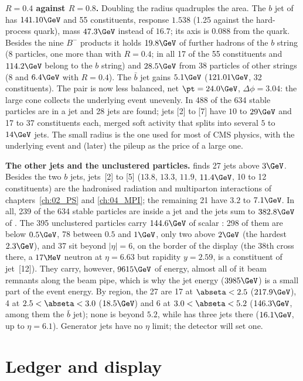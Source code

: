 \textbf{$R=0.4$ against $R=0.8$.} Doubling the radius quadruples the area. The $b$ jet of 
has $141.10\GeV$ and 55 constituents, response $1.538$ (1.25 against the hard-process quark), mass
$47.3\GeV$ instead of $16.7$; its axis is $0.088$ from the quark. Besides the nine $B^-$ products it holds
$19.8\GeV$ of further hadrons of the $b$ string (8 particles, one more than with $R=0.4$; in all 17 of the 55
constituents and $114.2\GeV$ belong to the $b$ string) and $28.5\GeV$ from 38 particles of other strings
(8 and $6.4\GeV$ with $R=0.4$). The $\bar b$ jet gains $5.1\GeV$ ($121.01\GeV$,
32 constituents). The pair is now less balanced, net $\pt=24.0\GeV$, $\Delta\phi=3.04$: the large cone
collects the underlying event unevenly. In  488 of the 634 stable particles are in a jet and
28 jets are found; jets [2] to [7] have $10$ to $29\GeV$ and 17 to 37 constituents each, merged soft activity
that  splits into several $5$ to $14\GeV$ jets. The small radius is the one used for most
of CMS physics, with the underlying event and (later) the pileup as the price of a large one.

\textbf{The other jets and the unclustered particles.}  finds 27 jets above $3\GeV$. Besides
the two $b$ jets, jets~[2] to [5] ($13.8$, $13.3$, $11.9$, $11.4\GeV$, 10 to 12 constituents) are the
hadronised radiation and multiparton interactions of chapters~\ref{ch:02_PS} and \ref{ch:04_MPI}; the
remaining 21 have $3.2$ to $7.1\GeV$. In all, 239 of the 634 stable particles are inside a jet and the jets
sum to $382.8\GeV$ of \pt{}. The 395 unclustered particles carry $144.6\GeV$ of scalar \pt{}: 298 of them are
below $0.5\GeV$, 78 between $0.5$ and $1\GeV$, only two above $2\GeV$ (the hardest $2.3\GeV$), and 37 sit
beyond $|\eta|=6$, on the border of the display (the 38th cross there, a $17\MeV$ neutron at $\eta=6.63$ but
rapidity $y=2.59$, is a constituent of jet~[12]). They carry, however, $9615\GeV$ of energy, almost all of it
beam remnants along the beam pipe, which is why the jet energy ($3985\GeV$) is a small part of the event
energy. By region, the 27  are 17 at $\abseta<2.5$ ($217.9\GeV$), 4 at $2.5<\abseta<3.0$
($18.5\GeV$) and 6 at $3.0<\abseta<5.2$ ($146.3\GeV$, among them the $\bar b$ jet); none is beyond $5.2$,
while  has three jets there ($16.1\GeV$, up to $\eta=6.1$). Generator jets have no $\eta$
limit; the detector will set one.

\section{Ledger and display}

